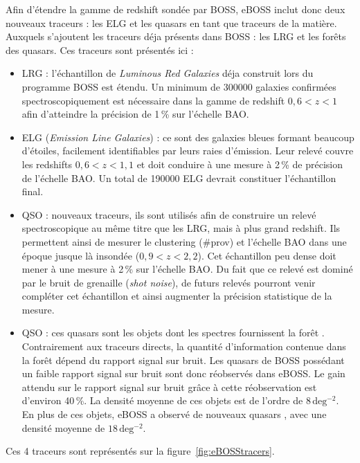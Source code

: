 \documentclass[11pt, twoside, a4paper, openright]{report}
\begin{document}
Afin d'étendre la gamme de redshift sondée par BOSS, eBOSS inclut donc deux nouveaux traceurs : les ELG et les quasars en tant que traceurs de la matière. Auxquels s'ajoutent les traceurs déja présents dans BOSS : les LRG et les forêts \lya{} des quasars. Ces traceurs sont présentés ici :
\begin{itemize}
\item LRG : l'échantillon de \emph{Luminous Red Galaxies} déja construit lors du programme BOSS est étendu. Un minimum de \num{300000} galaxies confirmées spectroscopiquement est nécessaire dans la gamme de redshift $0,6 < z < 1$ afin d'atteindre la précision de 1\,\% sur l'échelle BAO.
\item ELG (\emph{Emission Line Galaxies}) : ce sont des galaxies bleues formant beaucoup d'étoiles, facilement identifiables par leurs raies d'émission. Leur relevé couvre les redshifts $0,6 < z < 1,1$ et doit conduire à une mesure à 2\,\% de précision de l'échelle BAO. Un total de \num{190000} ELG devrait constituer l'échantillon final.
\item QSO : nouveaux traceurs, ils sont utilisés afin de construire un relevé spectroscopique au même titre que les LRG, mais à plus grand redshift. Ils permettent ainsi de mesurer le clustering (\#prov) et l'échelle BAO dans une époque jusque là insondée ($0,9 < z < 2,2$). Cet échantillon peu dense doit mener à une mesure à 2\,\% sur l'échelle BAO. Du fait que ce relevé est dominé par le bruit de grenaille (\emph{shot noise}), de futurs relevés pourront venir compléter cet échantillon et ainsi augmenter la précision statistique de la mesure.
\item \lya{} QSO : ces quasars sont les objets dont les spectres fournissent la forêt \lya{}. Contrairement aux traceurs directs, la quantité d'information contenue dans la forêt \lya{} dépend du rapport signal sur bruit. Les quasars \lya{} de BOSS possédant un faible rapport signal sur bruit sont donc réobservés dans eBOSS. Le gain attendu sur le rapport signal sur bruit grâce à cette réobservation est d'environ 40\,\%. La densité moyenne de ces objets est de l'ordre de $8\,\mathrm{deg^{-2}}$. \\
  En plus de ces objets, eBOSS a observé de nouveaux quasars \lya{}, avec une densité moyenne de $18\,\mathrm{deg^{-2}}$.
\end{itemize}
Ces 4 traceurs sont représentés sur la figure~\ref{fig:eBOSStracers}.
\end{document}
